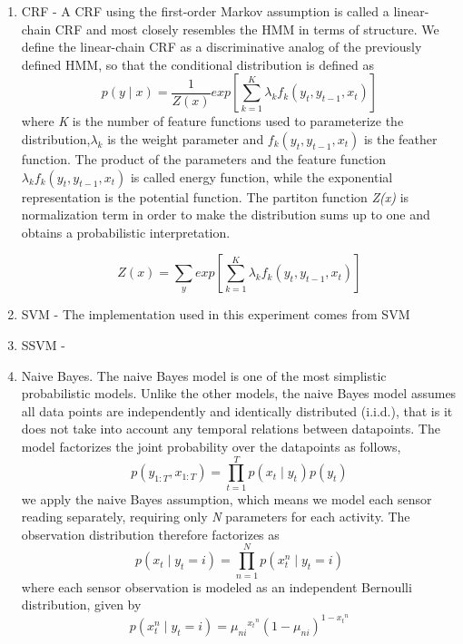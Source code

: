 \documentclass[11pt, oneside]{article}   	%
\begin{document}
\begin{enumerate}
\item CRF - 
A CRF using the first-order Markov assumption is called a linear-chain CRF and most closely resembles the HMM in terms of structure. We define the linear-chain CRF as a discriminative analog of the previously defined HMM, so that the conditional distribution is defined as
\begin{equation}
p(y\mid x)=\frac{1}{Z(x)}exp\left[{\sum_{k=1}^{K}}{\lambda}_{k}{f}_{k}({y}_{t},{y}_{t-1},{x}_{t})\right]
\end{equation}
where \textit{K} is the number of feature functions used to parameterize the distribution,${\lambda}_{k}$ is the weight parameter and ${f}_{k}({y}_{t},{y}_{t-1},{x}_{t})$ is the feather function. The product of the parameters and the feature function${\lambda}_{k}{f}_{k}({y}_{t},{y}_{t-1},{x}_{t})$ is called energy function, while the exponential representation is the potential function. The partiton function \textit{Z(x)} is normalization term in order to make the distribution sums up to one and obtains a probabilistic interpretation.

\begin{equation}
Z(x)=\sum_{y}^{}exp\left[{\sum_{k=1}^{K}}{\lambda}_{k}{f}_{k}({y}_{t},{y}_{t-1},{x}_{t})\right]
\end{equation}

\item SVM - 
The implementation used in this experiment comes from SVM

\item SSVM - 

\item Naive Bayes.
The naive Bayes model is one of the most simplistic probabilistic models. Unlike the other models, the naive Bayes model assumes all data points are independently and identically distributed (i.i.d.), that is it does not take into account any temporal relations between datapoints. The model factorizes the joint probability over the datapoints as follows,
\begin{equation}
p({y}_{1:T},{x}_{1:T})=\prod_{t=1}^{T}p({{x}_{t}\mid {y}_{t}}^{})p({y}_{t})
\end{equation}
we apply the naive Bayes assumption, which means we model each sensor reading separately, requiring only
\textit{N} parameters for each activity. The observation distribution therefore factorizes as
\begin{equation}
p({x}_{t}\mid{y}_{t}=i)=\prod_{n=1}^{N}p({{x}_{t}^{n}\mid {y}_{t}}=i)
\end{equation}
where each sensor observation is modeled as an independent Bernoulli distribution, given by
\begin{equation}
p({{x}_{t}^{n}\mid {y}_{t}}=i)={{\mu}_{ni}}^{{{x}_{t}}^n}{(1-{\mu}_{ni})}^{1-{{x}_{t}}^n}
\end{equation}

\end{enumerate}
\end{document}
